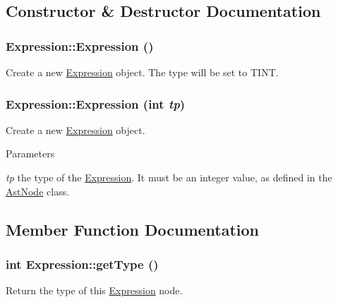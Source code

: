 \subsection{Constructor \& Destructor Documentation}
\hypertarget{classExpression_afcf87716bf0abfe8d414c92529e1564a}{
\subsubsection[{Expression}]{\setlength{\rightskip}{0pt plus 5cm}Expression::Expression ()}}
\label{classExpression_afcf87716bf0abfe8d414c92529e1564a}
Create a new \hyperlink{classExpression}{Expression} object. The type will be set to TINT. \hypertarget{classExpression_a3b3e124dd46ae70e1aae195089e839ab}{
\subsubsection[{Expression}]{\setlength{\rightskip}{0pt plus 5cm}Expression::Expression (int {\em tp})}}
\label{classExpression_a3b3e124dd46ae70e1aae195089e839ab}
Create a new \hyperlink{classExpression}{Expression} object.


\begin{DoxyParams}{Parameters}
\item[{\em tp}]the type of the \hyperlink{classExpression}{Expression}. It must be an integer value, as defined in the \hyperlink{classAstNode}{AstNode} class. \end{DoxyParams}


\subsection{Member Function Documentation}
\hypertarget{classExpression_add42721451cd946ac4e02ced146b95b7}{
\subsubsection[{getType}]{\setlength{\rightskip}{0pt plus 5cm}int Expression::getType ()}}
\label{classExpression_add42721451cd946ac4e02ced146b95b7}
Return the type of this \hyperlink{classExpression}{Expression} node.

